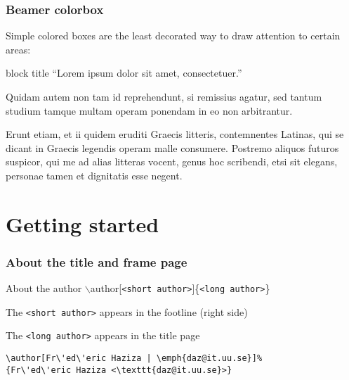 \documentclass{beamer}
\begin{document}
\begin{frame}
  \frametitle{Beamer colorbox}

  Simple colored boxes are the least decorated way to draw attention to certain areas:\newline

  \begin{beamercolorbox}[sep=0.5em]{block title}
    ``Lorem ipsum dolor sit amet, consectetuer.''
  \end{beamercolorbox}

  \vspace*{.5cm}

  Quidam autem non tam id reprehendunt, si remissius agatur, sed tantum studium
  tamque multam operam ponendam in eo non arbitrantur.

  Erunt etiam, et ii quidem eruditi Graecis litteris, contemnentes Latinas, qui
  se dicant in Graecis legendis operam malle consumere. Postremo aliquos futuros
  suspicor, qui me ad alias litteras vocent, genus hoc scribendi, etsi sit
  elegans, personae tamen et dignitatis esse negent.

\end{frame}

\section{Getting started}

\begin{frame}[fragile]
  \frametitle{About the title and frame page}
  
  \begin{block}{About the author}
    $\backslash$author[\texttt{<short author>}]\{\texttt{<long author>}\}
  \end{block}
    
  The \texttt{<short author>} appears in the footline (right side)
  
  The \texttt{<long author>} appears in the title page
  
  \begin{example}
\begin{verbatim}
\author[Fr\'ed\'eric Haziza | \emph{daz@it.uu.se}]%
{Fr\'ed\'eric Haziza <\texttt{daz@it.uu.se}>}
\end{verbatim}
  \end{example}
\end{frame}
\end{document}
